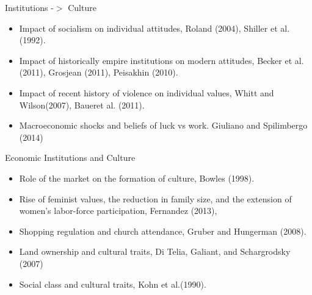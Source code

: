 \documentclass{beamer}
\begin{document}
\begin{frame}{Institutions -$>$ Culture}

\begin{itemize}
    \item Impact of socialism on individual attitudes, Roland (2004),  Shiller et al. (1992).
    \pause 
    \item  Impact of historically empire institutions on modern attitudes, Becker et al. (2011), Grosjean (2011), Peisakhin (2010).
    \pause
    \item Impact of recent history of violence on individual values, Whitt and Wilson(2007),  Baueret al. (2011).
    \pause
    \item Macroeconomic shocks and beliefs of luck vs work. Giuliano and Spilimbergo (2014)

\end{itemize}
    
\end{frame}
\begin{frame}{Economic Institutions and Culture}

\begin{itemize}
    \item Role of the market on the formation of culture, Bowles (1998).
    \pause 
    \item Rise of feminist values, the reduction in  family size, and  the extension of women's labor-force participation, Fernandez (2013), 
    \pause
    \item Shopping regulation and church attendance, Gruber and Hungerman (2008).
    \pause
    \item Land ownership and cultural traits, Di Telia, Galiant, and Schargrodsky (2007)
    \pause
    \item Social class and cultural traits, Kohn et al.(1990). 

\end{itemize}
    
\end{frame}
\end{document}
